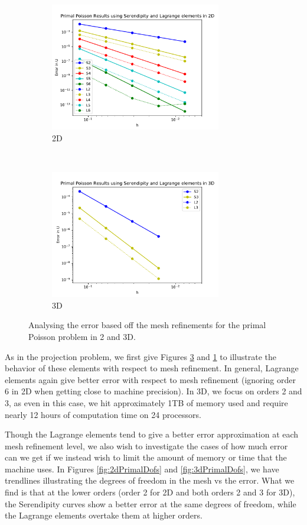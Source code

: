 \documentclass[manuscript,screen]{acmart}
\begin{document}
\begin{figure}[t!]
  \centering
  \begin{subfigure}[t]{0.5\textwidth}
    \centering
    \includegraphics[height=2.2in]{2dPrimalH.pdf}
    \caption{2D}
    \label{fig:2dPrimalH}
  \end{subfigure}
  ~
  \begin{subfigure}[t]{0.5\textwidth}
    \centering
    \includegraphics[height=2.2in]{3dPrimalH.pdf}
    \caption{3D}
    \label{fig:3dPrimalH}
  \end{subfigure}
  \caption{Analysing the error based off the mesh refinements for the primal Poisson problem in 2 and 3D.}
\end{figure}  
\noindent  As in the projection problem, we first give Figures \ref{fig:3dPrimalH} and \ref{fig:2dPrimalH} to illustrate the behavior of these elements with respect to mesh refinement.  In general, Lagrange elements again give better error with respect to mesh refinement (ignoring order 6 in 2D when getting close to machine precision).  In 3D, we focus on orders 2 and 3, as even in this case, we hit approximately 1TB of memory used and require nearly 12 hours of computation time on 24 processors.

\noindent Though the Lagrange elements tend to give a better error approximation at each mesh refinement level, we also wish to investigate the cases of how much error can we get if we instead wish to limit the amount of memory or time that the machine uses.  In Figures \ref{fig:2dPrimalDofs} and \ref{fig:3dPrimalDofs}, we have trendlines illustrating the degrees of freedom in the mesh vs the error.  What we find is that at the lower orders (order 2 for 2D and both orders 2 and 3 for 3D), the Serendipity curves show a better error  at the same degrees of freedom, while the Lagrange elements overtake them at higher orders.  
\end{document}
